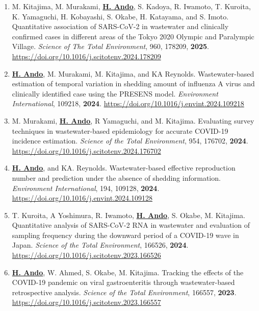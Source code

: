 \documentclass[11pt,a4paper]{article}
\begin{document}
\begin{enumerate}[label=\arabic*., series=pubcount, leftmargin=1.5em, nosep]
    \item M. Kitajima, M. Murakami, \textbf{\underline{H. Ando}}, S. Kadoya, R. Iwamoto, T. Kuroita, K. Yamaguchi, H. Kobayashi, S. Okabe, H. Katayama, and S. Imoto. Quantitative association of SARS-CoV-2 in wastewater and clinically confirmed cases in different areas of the Tokyo 2020 Olympic and Paralympic Village. \textit{Science of The Total Environment}, 960, 178209, \textbf{2025}. \url{https://doi.org/10.1016/j.scitotenv.2024.178209}
    \addtocounter{enumi}{-2}

    \item \textbf{\underline{H. Ando}}, M. Murakami, M. Kitajima, and KA Reynolds. Wastewater-based estimation of temporal variation in shedding amount of influenza A virus and clinically identified case using the PRESENS model. \textit{Environment International}, 109218, \textbf{2024}. \url{https://doi.org/10.1016/j.envint.2024.109218}
    \addtocounter{enumi}{-2}

    \item M. Murakami, \textbf{\underline{H. Ando}}, R Yamaguchi, and M. Kitajima. Evaluating survey techniques in wastewater-based epidemiology for accurate COVID-19 incidence estimation. \textit{Science of the Total Environment}, 954, 176702, \textbf{2024}. \url{https://doi.org/10.1016/j.scitotenv.2024.176702}
    \addtocounter{enumi}{-2}

    \item \textbf{\underline{H. Ando}}, and KA. Reynolds. Wastewater-based effective reproduction number and prediction under the absence of shedding information. \textit{Environment International}, 194, 109128, \textbf{2024}. \url{https://doi.org/10.1016/j.envint.2024.109128}
    \addtocounter{enumi}{-2}

    \item T. Kuroita, A Yoshimura, R. Iwamoto, \textbf{\underline{H. Ando}}, S. Okabe, M. Kitajima. Quantitative analysis of SARS-CoV-2 RNA in wastewater and evaluation of sampling frequency during the downward period of a COVID-19 wave in Japan. \textit{Science of the Total Environment}, 166526, \textbf{2024}. \url{https://doi.org/10.1016/j.scitotenv.2023.166526}
    \addtocounter{enumi}{-2}

    \item \textbf{\underline{H. Ando}}, W. Ahmed, S. Okabe, M. Kitajima. Tracking the effects of the COVID-19 pandemic on viral gastroenteritis through wastewater-based retrospective analysis. \textit{Science of the Total Environment}, 166557, \textbf{2023}. \url{https://doi.org/10.1016/j.scitotenv.2023.166557}
    \addtocounter{enumi}{-2}


\end{enumerate}
\end{document}
